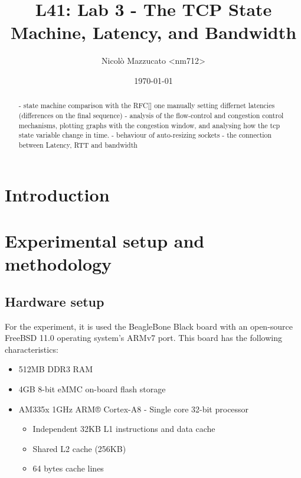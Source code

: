 \documentclass[a4paper,10pt]{article}
\begin{document}
\title{L41: Lab 3 - The TCP State Machine, Latency, and Bandwidth}
\author{Nicolò Mazzucato \textless{}nm712\textgreater{}}
\date{\today}

\maketitle

\thispagestyle{empty}

\begin{abstract}           

   - state machine comparison with the RFC[] one manually setting differnet latencies (differences on the final sequence)
   - analysis of the flow-control and congestion control mechanisms, plotting graphs with the congestion window, and analysing how the tcp state variable change in time.
   - behaviour of auto-resizing sockets
   - the connection between Latency, RTT and bandwidth


\end{abstract}

\clearpage

\setcounter{page}{1}

\section{Introduction}


\section{Experimental setup and methodology}

\subsection{Hardware setup}

For the experiment, it is used the BeagleBone Black board with an open-source FreeBSD\cite{mckusick_design_2014} 11.0 operating system’s ARMv7 port. This board has the following characteristics:
\begin{itemize}
    \item 512MB DDR3 RAM
    \item 4GB 8-bit eMMC on-board flash storage
    \item AM335x 1GHz ARM® Cortex-A8 - Single core 32-bit processor\cite{noauthor_am3358_nodate}
    \begin{itemize}
        \item Independent 32KB L1 instructions and data cache
        \item Shared L2 cache (256KB)
        \item 64 bytes cache lines
    \end{itemize}
\end{itemize}
\end{document}
